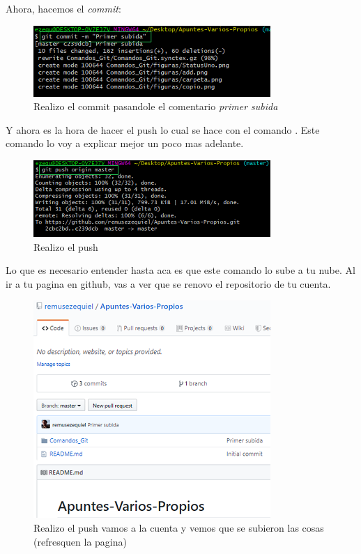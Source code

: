 \documentclass[10pt,journal,compsoc]{IEEEtran}
\begin{document}
\newpage
Ahora, hacemos el \textit{commit}:
\begin{figure}[H]
  \begin{center}
	 \includegraphics{figuras/commit.png}
	 \centering
	 \renewcommand{\arraystretch}{1.3}
	 \caption{Realizo el commit pasandole el comentario \textit{primer subida}}
  \end{center}
\end{figure}
Y ahora es la hora de hacer el push lo cual se hace con el comando \textit{\color{Blue}{git push origin master}}. Este comando lo voy a explicar mejor un poco mas adelante.
\begin{figure}[H]
  \begin{center}
	 \includegraphics{figuras/push.png}
	 \centering
	 \renewcommand{\arraystretch}{1.3}
	 \caption{Realizo el push}
  \end{center}
\end{figure}

 Lo que es necesario entender hasta aca es que este comando lo sube a tu nube. Al ir a tu pagina en github, vas a ver que se renovo el repositorio de tu cuenta.
\begin{figure}[H]
  \begin{center}
	 \includegraphics{figuras/repoPush.png}
	 \centering
	 \renewcommand{\arraystretch}{1.3}
	 \caption{Realizo el push vamos a la cuenta y vemos que se subieron las cosas (refresquen la pagina)}
  \end{center}
\end{figure} 
\end{document}
